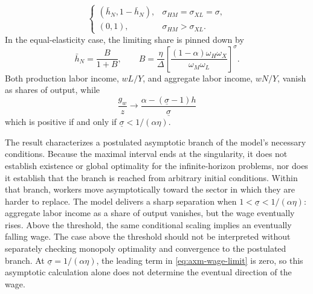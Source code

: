 \begin{conditionalresult}
\begin{equation}
\begin{cases}
  (\bar h_N,1-\bar h_N),
      &\sigma_{HM}=\sigma_{XL}=\sigma,\\
  (0,1),&\sigma_{HM}>\sigma_{XL}.
 \end{cases}
 \label{eq:axm-singular-labor-allocation}
\end{equation}
In the equal-elasticity case, the limiting share is pinned down by
\begin{equation}
 \bar h_N=\frac{B}{1+B},\qquad
 B=\frac{\eta}{\Delta}
 \left[
  \frac{(1-\alpha)\omega_H\omega_X}{\omega_M\omega_L}
 \right]^{\sigma}.
 \label{eq:axm-singular-equal-elasticity-share}
\end{equation}
Both production labor income, \(wL/Y\), and aggregate labor income, \(wN/Y\),
vanish as shares of output, while
\begin{equation}
 \frac{g_w}{z}\to
 \frac{\alpha-(\underline\sigma-1)h}{\underline\sigma}
 \label{eq:axm-wage-limit}
\end{equation}
which is positive if and only if
\(\underline\sigma<1/(\alpha\eta)\).
\end{conditionalresult}

The result characterizes a postulated asymptotic branch of the model's necessary
conditions. Because the maximal interval ends at the singularity, it does not
establish existence or global optimality for the infinite-horizon problems, nor
does it establish that the branch is reached from arbitrary initial conditions.
Within that branch, workers move asymptotically toward the sector in which they
are harder to replace. The model delivers a sharp separation when
\(1<\underline\sigma<1/(\alpha\eta)\): aggregate labor income as a share of output
vanishes, but the wage eventually rises. Above the threshold, the same conditional
scaling implies an eventually falling wage. The case above the threshold should
not be interpreted without separately
checking monopoly optimality and convergence to the postulated branch.
At \(\underline\sigma=1/(\alpha\eta)\), the leading term in
\eqref{eq:axm-wage-limit} is zero, so this asymptotic calculation alone does not
determine the eventual direction of the wage.
